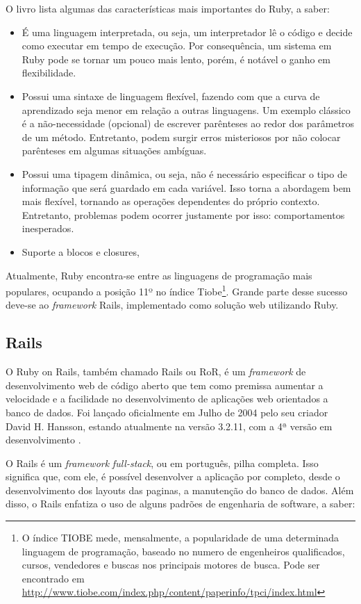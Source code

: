 	O livro \cite{rails3} lista algumas das características mais importantes do Ruby, a saber:
\begin{itemize}
\item É uma linguagem interpretada, ou seja, um interpretador lê o código e decide como executar em tempo de execução. Por consequência, um sistema em Ruby pode se tornar um pouco mais lento, porém, é notável o ganho em flexibilidade.
\item Possui uma sintaxe de linguagem flexível, fazendo com que a curva de aprendizado seja menor em relação a outras linguagens. Um exemplo clássico é a não-necessidade (opcional) de escrever parênteses ao redor dos parâmetros de um método. Entretanto, podem surgir erros misteriosos por não colocar parênteses em algumas situações ambíguas.
\item Possui uma tipagem dinâmica, ou seja, não é necessário especificar o tipo de informação que será guardado em cada variável. Isso torna a abordagem bem mais flexível, tornando as operações dependentes do próprio contexto. Entretanto, problemas podem ocorrer justamente por isso: comportamentos inesperados.
\item Suporte a blocos e closures,
\end{itemize}
	
	Atualmente, Ruby encontra-se entre as linguagens de programação mais populares, ocupando a posição 11º no índice Tiobe\footnote{O índice TIOBE mede, mensalmente, a popularidade de uma determinada linguagem de programação, baseado no numero de engenheiros qualificados, cursos, vendedores e buscas nos principais motores de busca. Pode ser encontrado em \url{http://www.tiobe.com/index.php/content/paperinfo/tpci/index.html} }.  Grande parte desse sucesso deve-se ao \emph{framework} Rails, implementado como solução web utilizando Ruby.

\subsection{Rails}
	O Ruby on Rails, também chamado Rails ou RoR, é um \emph{framework} de desenvolvimento web de código aberto que tem como premissa aumentar a velocidade e a facilidade no desenvolvimento de aplicações web orientados a banco de dados.  Foi lançado oficialmente em Julho de 2004 pelo seu criador David H. Hansson, estando atualmente na versão 3.2.11, com a 4ª versão em desenvolvimento \cite{rails4}.  
	
	O Rails é um \emph{framework} \emph{full-stack}, ou em português, pilha completa. Isso significa que, com ele, é possível desenvolver a aplicação por completo, desde o desenvolvimento dos layouts das paginas, a manutenção do banco de dados. Além disso, o Rails enfatiza o uso de alguns padrões de engenharia de software, a saber:
	
